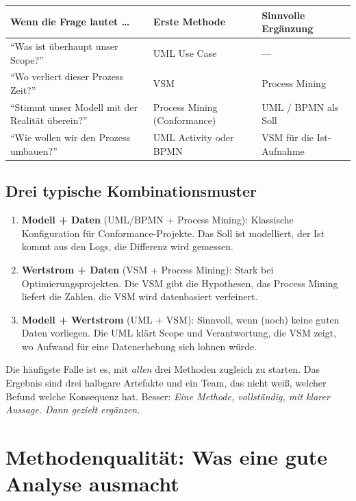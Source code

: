 \documentclass[11pt,a4paper,oneside]{article}
\newcommand{\fachbegriff}[1]{\textbf{#1}}
\begin{document}
\begin{tabularx}{\linewidth}{@{}lX X@{}}
\toprule
\textbf{Wenn die Frage lautet \ldots} & \textbf{Erste Methode} & \textbf{Sinnvolle Ergänzung} \\
\midrule
``Was ist überhaupt unser Scope?'' & UML Use Case & --- \\
``Wo verliert dieser Prozess Zeit?'' & VSM & Process Mining \\
``Stimmt unser Modell mit der Realität überein?'' & Process Mining (Conformance) & UML / BPMN als Soll \\
``Wie wollen wir den Prozess umbauen?'' & UML Activity oder BPMN & VSM für die Ist-Aufnahme \\
\bottomrule
\end{tabularx}

\subsection{Drei typische Kombinationsmuster}

\begin{enumerate}
  \item \fachbegriff{Modell + Daten} (UML/BPMN + Process Mining): Klassische Konfiguration für Conformance-Projekte. Das Soll ist modelliert, der Ist kommt aus den Logs, die Differenz wird gemessen.
  \item \fachbegriff{Wertstrom + Daten} (VSM + Process Mining): Stark bei Optimierungsprojekten. Die VSM gibt die Hypothesen, das Process Mining liefert die Zahlen, die VSM wird datenbasiert verfeinert.
  \item \fachbegriff{Modell + Wertstrom} (UML + VSM): Sinnvoll, wenn (noch) keine guten Daten vorliegen. Die UML klärt Scope und Verantwortung, die VSM zeigt, wo Aufwand für eine Datenerhebung sich lohnen würde.
\end{enumerate}

\begin{merkbox}
Die häufigste Falle ist es, mit \emph{allen} drei Methoden zugleich zu starten. Das Ergebnis sind drei halbgare Artefakte und ein Team, das nicht weiß, welcher Befund welche Konsequenz hat. Besser: \emph{Eine Methode, vollständig, mit klarer Aussage. Dann gezielt ergänzen.}
\end{merkbox}

\section{Methodenqualität: Was eine gute Analyse ausmacht}
\end{document}
